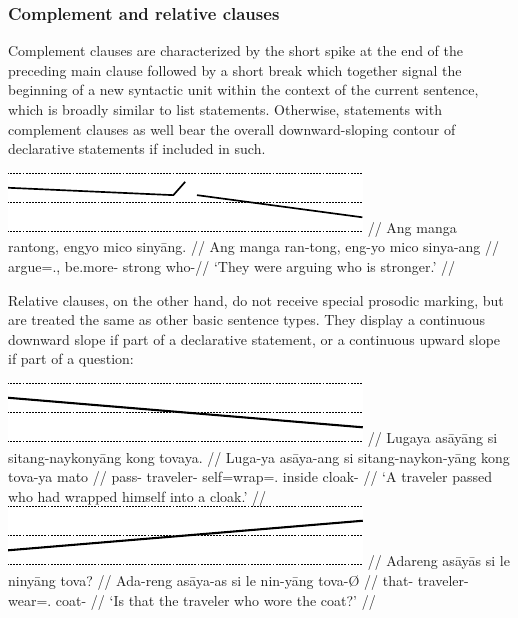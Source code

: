 \subsubsection{Complement and relative clauses}

Complement clauses are characterized by the short 
spike at the end of the preceding main clause followed by a short break which 
together signal the beginning of a new syntactic unit within the context of 
the current sentence, which is broadly similar to list statements. Otherwise, 
statements with complement clauses as well bear the overall downward-sloping 
contour of declarative statements if included in such.

\ex\begingl
	\glpreamble \raisebox{-1.5em}
		{\includegraphics{images/contours-complement.pdf}} //
	\gla Ang manga rantong, engyo mico sinyāng. //
	\glb Ang manga ran-tong, eng-yo mico sinya-ang //
	\glc \AgtT{} \Prog{} argue=\TplN{}.\Aarg{}, be.more-\TsgN{} strong
		who-\Aarg{}//
	\glft `They were arguing who is stronger.' //
\endgl\xe

Relative clauses, on the other hand, do not receive 
special prosodic marking, but are treated the same as other basic sentence 
types. They display a continuous downward slope if part of a 
declarative statement, or a continuous upward slope if part of a question:

\pex[belowexskip=0em]
\a\begingl
	\glpreamble \raisebox{-1.5em}
		{\includegraphics{images/contours-statement.pdf}} //
	\gla Lugaya asāyāng si sitang-naykonyāng kong tovaya. //
	\glb Luga-ya asāya-ang si sitang-naykon-yāng kong tova-ya mato //
	\glc pass-\TsgM{} traveler-\Aarg{} \Rel{} self=wrap=\TsgM{}.\Aarg{} 
		inside cloak-\Loc{} //
	\glft `A traveler passed who had wrapped himself into a cloak.' //
\endgl
\\

\a\label{ex:travelercoat}\begingl
	\glpreamble \raisebox{-1.5em}
		{\includegraphics{images/contours-ynquestion.pdf}} //
	\gla Adareng asāyās si le ninyāng tova? //
	\glb Ada-reng asāya-as si le nin-yāng tova-Ø //
	\glc that-\AargI{} traveler-\Parg{} \Rel{} \PatTI{} wear=\TsgM{}.\Aarg{} 
		coat-\Top{} //
	\glft `Is that the traveler who wore the coat?' //
\endgl
\xe

